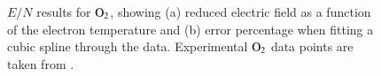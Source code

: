 %
\begin{figure}[!htbp]
\caption{$E/N$ results for $\rm O_2$, showing (a) reduced electric field as a function of the electron temperature and (b) error percentage when fitting a cubic spline through the data. Experimental $\rm O_2$ data points are taken from .}
\label{fig:electronimpact_2}
\end{figure}


